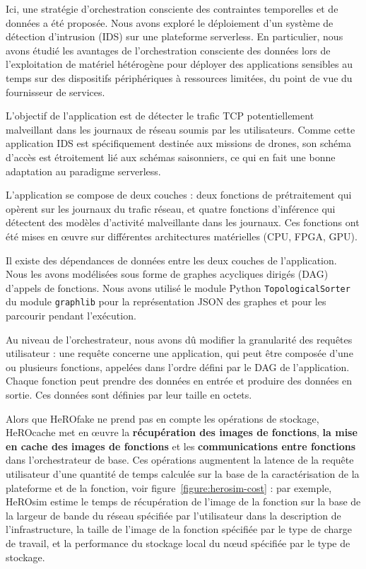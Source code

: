 Ici, une stratégie d'orchestration consciente des contraintes temporelles et de données a été proposée. Nous avons exploré le déploiement d'un système de détection d'intrusion (IDS) sur une plateforme serverless. En particulier, nous avons étudié les avantages de l'orchestration consciente des données lors de l'exploitation de matériel hétérogène pour déployer des applications sensibles au temps sur des dispositifs périphériques à ressources limitées, du point de vue du fournisseur de services.

L'objectif de l'application est de détecter le trafic TCP potentiellement malveillant dans les journaux de réseau soumis par les utilisateurs. Comme cette application IDS est spécifiquement destinée aux missions de drones, son schéma d'accès est étroitement lié aux schémas saisonniers, ce qui en fait une bonne adaptation au paradigme serverless.

L'application se compose de deux couches : deux fonctions de prétraitement qui opèrent sur les journaux du trafic réseau, et quatre fonctions d'inférence qui détectent des modèles d'activité malveillante dans les journaux. Ces fonctions ont été mises en œuvre sur différentes architectures matérielles (CPU, FPGA, GPU). 

Il existe des dépendances de données entre les deux couches de l'application. Nous les avons modélisées sous forme de graphes acycliques dirigés (DAG) d'appels de fonctions. Nous avons utilisé le module Python \texttt{TopologicalSorter} du module \texttt{graphlib} pour la représentation JSON des graphes et pour les parcourir pendant l'exécution.

Au niveau de l'orchestrateur, nous avons dû modifier la granularité des requêtes utilisateur : une requête concerne une application, qui peut être composée d'une ou plusieurs fonctions, appelées dans l'ordre défini par le DAG de l'application. Chaque fonction peut prendre des données en entrée et produire des données en sortie. Ces données sont définies par leur taille en octets.

Alors que HeROfake ne prend pas en compte les opérations de stockage, HeROcache met en œuvre la \textbf{récupération des images de fonctions}, \textbf{la mise en cache des images de fonctions} et les \textbf{communications entre fonctions} dans l'orchestrateur de base. Ces opérations augmentent la latence de la requête utilisateur d'une quantité de temps calculée sur la base de la caractérisation de la plateforme et de la fonction, voir figure~\ref{figure:herosim-cost} : par exemple, HeROsim estime le temps de récupération de l'image de la fonction sur la base de la largeur de bande du réseau spécifiée par l'utilisateur dans la description de l'infrastructure, la taille de l'image de la fonction spécifiée par le type de charge de travail, et la performance du stockage local du nœud spécifiée par le type de stockage.

